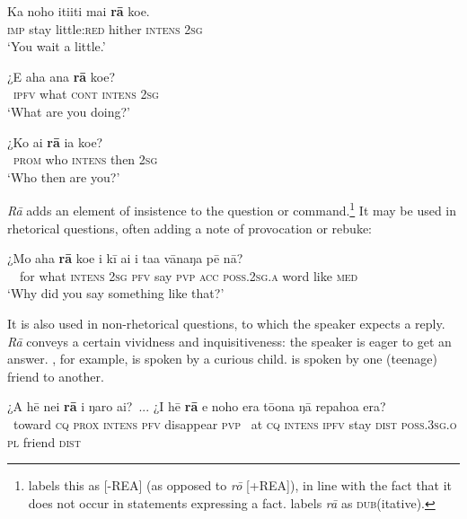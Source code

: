 \ea\label{ex:4.176}
\gll Ka noho {\ꞌ}iti{\ꞌ}iti mai \textbf{rā} koe. \\
\textsc{imp} stay little:\textsc{red} hither \textsc{intens} \textsc{2sg} \\

\glt 
‘You wait a little.’ \textstyleExampleref{[R208.164]} 
\z

\ea\label{ex:4.177}
\gll ¿E aha {\ꞌ}ana \textbf{rā} koe? \\
~\textsc{ipfv} what \textsc{cont} \textsc{intens} \textsc{2sg} \\

\glt 
‘What are you doing?’ \textstyleExampleref{[R212.054]} 
\z

\ea\label{ex:4.178}
\gll ¿Ko ai \textbf{rā} ia koe? \\
~\textsc{prom} who \textsc{intens} then \textsc{2sg} \\

\glt 
‘Who then are you?’ \textstyleExampleref{[R314.099]} 
\z

\textit{Rā} adds an element of insistence to the question or command.\footnote{\label{fn:207}\citet{DuFeu1987,DuFeu1996} labels this  as [-REA] (as opposed to \textit{rō} [+REA]), in line with the fact that it does not occur in statements expressing a fact. \citet{WeberR2003} labels \textit{rā} as \textsc{dub}(itative).} It may be used in rhetorical questions, often adding a note of provocation or rebuke:

\ea\label{ex:4.179}
\gll ¿Mo aha \textbf{rā} koe i kī ai i ta{\ꞌ}a vānaŋa pē nā? \\
~~for what \textsc{intens} \textsc{2sg} \textsc{pfv} say \textsc{pvp} \textsc{acc} \textsc{poss.2sg.a} word like \textsc{med} \\

\glt 
‘Why did you say something like that?’ \textstyleExampleref{[R301.301]} 
\z

It is also used in non-rhetorical questions, to which the speaker expects a reply. \textit{Rā} conveys a certain vividness and inquisitiveness: the speaker is eager to get an answer. , for example, is spoken by a curious child.  is spoken by one (teenage) friend to another.

\ea\label{ex:4.180}
\gll ¿A hē nei \textbf{rā} i ŋaro ai?~... ¿{\ꞌ}I hē \textbf{rā} e noho era  tō{\ꞌ}ona ŋā repahoa era?\\
~toward \textsc{cq} \textsc{prox} \textsc{intens} \textsc{pfv} disappear \textsc{pvp} ~at \textsc{cq} \textsc{intens} \textsc{ipfv} stay \textsc{dist}  \textsc{poss.3sg.o} \textsc{pl} friend \textsc{dist}\\

